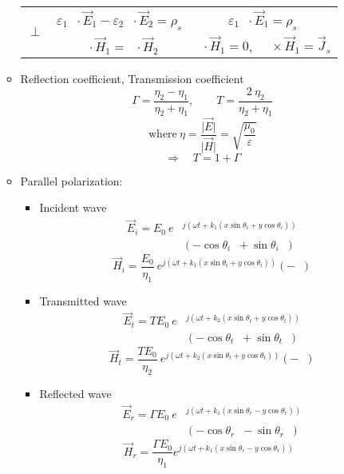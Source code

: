 \documentclass[a4paper, 11pt]{article}
\DeclareMathOperator{\hn}{\hat{\mathbf{n}}}
\DeclareMathOperator{\hx}{\hat{\mathbf{x}}}
\DeclareMathOperator{\hy}{\hat{\mathbf{y}}}
\DeclareMathOperator{\hz}{\hat{\mathbf{z}}}
\begin{document}
\begin{multicols}{2}
\begin{enumerate}
\begin{itemize}[leftmargin=*]
\begin{table}[H]
\begin{tabular}{ccc}
            \multirow{2}{*}{$\perp$} & $\varepsilon_{1}\hn\cdot\vec{E}_{1}-\varepsilon_{2}\hn\cdot\vec{E}_{2}=\rho_{s}$  & $\varepsilon_{1} \hn\cdot\vec{E}_{1}=\rho_{s}$ \\
            &                  $\hn\cdot\vec{H}_{1}=\hn\cdot\vec{H}_{2}$ & $\hn\cdot\vec{H}_{1}=0$, \ $\hn\times \vec{H}_{1}=\vec{J}_{s}$ \\ 
            \bottomrule
		\end{tabular}
		\end{table}
	\item Reflection coefficient, Transmission
 coefficient 
        \[
            \Gamma=\frac{\eta_{2}-\eta_{1}}{\eta_{2}+\eta_{1}}, 
            \quad \quad 
            T=\frac{2 \ \eta_{2}}{\eta_{2}+\eta_{1}}
        \]
        \[
            \text{where} \ \eta=\frac{\lvert \vec{E} \rvert}{\lvert \vec{H} \rvert}=\sqrt{\frac{\mu_{0}}{\varepsilon}}
        \] 
        \[ \Rightarrow \quad T=1+\Gamma \]
        
	\item Parallel polarization:
	\begin{itemize}[leftmargin=*]
		\item Incident wave 
            \begin{align*}
                \vec{E}_{i}
                = E_{0} \  e&^{{j(\omega t + k_{1}(x\sin\theta_{i} + y \cos \theta_{i}))}} \\
                & (-\cos \theta_{i} \hx + \sin \theta_{i} \hy)
            \end{align*}
		\[
                \vec{H}_{i} = 
                \frac{E_{0}}{\eta_{1}} \ e^{j(\omega t+k_{1}(x\sin\theta_{i}+y\cos\theta_{i}))}(-\hz)
            \]
            
		\item Transmitted wave 
            \begin{align*}
                \vec{E}_{t} = TE_{0} \ e& ^{j(\omega t+k_{2}( x \sin \theta_{t} + y \cos \theta_{t}))}\\
                & (-\cos \theta_{t} \hx + \sin \theta_{t} \hy) 
            \end{align*}
		\[
                \vec{H}_{t} = 
                \frac{TE_{0}}{\eta_{2}} \ e^{j(\omega t+k_{2}(x\sin\theta_{t}+y\cos\theta_{t}))}(-\hz)
            \]
            
		\item Reflected wave 
            \begin{align*}
                \vec{E}_{r} = \Gamma E_{0} \ e & ^{j(\omega t+k_{1}(x\sin\theta_{r}-y\cos\theta_{r}))} \\
                & (-\cos\theta_{r}\hx-\sin\theta_{r}\hy)    
            \end{align*}
		\[
                \vec{H}_{r}=\frac{\Gamma E_{0}}{\eta_{1}}e^{j(\omega t+k_{1}(x\sin\theta_{r}-y\cos\theta_{r}))}\hz
            \]
	\end{itemize}
 

\end{itemize}
\end{enumerate}
\end{multicols}
\end{document}
